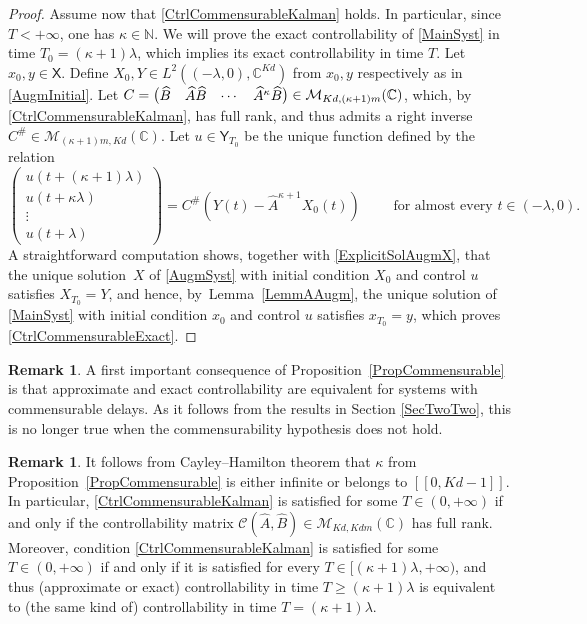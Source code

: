 \documentclass[JEP,XML,SOM,Unicode]{cedram}
\renewenvironment{bmatrix}{\bigl(\begin{matrix}}{\end{matrix}\bigr)}
\newcommand{\llbracket}{[\![}
\newcommand{\rrbracket}{]\!]}
\theoremstyle{plain}
\theoremstyle{definition}
\newtheorem{remk}[theo]{Remark}
\begin{document}
\begin{proof}
Assume now that \eqref{CtrlCommensurableKalman} holds. In particular, since $T < +\infty$, one has $\kappa \in \mathbb N$. We will prove the exact controllability of \eqref{MainSyst} in time $T_0 = (\kappa + 1)\lambda$, which implies its exact controllability in time $T$. Let $x_0, y \in \mathsf X$. Define $X_0, Y \in L^2((-\lambda, 0), \mathbb C^{Kd})$ from $x_0, y$ respectively as in \eqref{AugmInitial}. Let $C = \begin{bmatrix}\widehat B & \widehat A \widehat B & \cdots & \widehat A^\kappa \widehat B\end{bmatrix} \in \mathcal M_{Kd, (\kappa + 1) m}(\mathbb C)$, which, by \eqref{CtrlCommensurableKalman}, has full rank, and thus admits a right inverse $C^\# \in \mathcal M_{(\kappa + 1) m, Kd}(\mathbb C)$. Let $u \in \mathsf Y_{T_0}$ be the unique function defined by the relation
\[
\begin{pmatrix}
u(t + (\kappa + 1)\lambda) \\
u(t + \kappa \lambda) \\
\vdots \\
u(t + \lambda)
\end{pmatrix} = C^\# \left(Y(t) - \widehat A^{\kappa + 1} X_0(t)\right) \qquad \text{ for almost every } t \in (-\lambda, 0).
\]
A straightforward computation shows, together with \eqref{ExplicitSolAugmX}, that the unique solution~$X$ of \eqref{AugmSyst} with initial condition $X_0$ and control $u$ satisfies $X_{T_0} = Y$, and hence, by~Lemma~\ref{LemmAAugm}, the unique solution of \eqref{MainSyst} with initial condition $x_0$ and control $u$ satisfies $x_{T_0} = y$, which proves \eqref{CtrlCommensurableExact}.
\end{proof}

\begin{remk}
A first important consequence of Proposition~\ref{PropCommensurable} is that approximate and exact controllability are equivalent for systems with commensurable delays. As it follows from the results in Section \ref{SecTwoTwo}, this is no longer true when the commensurability hypothesis does not hold.
\end{remk}

\begin{remk}
\label{RemkCayleyHamilton}
It follows from Cayley--Hamilton theorem that $\kappa$ from Proposition~\ref{PropCommensurable} is either infinite or belongs to $\llbracket 0, Kd - 1\rrbracket$. In particular, \eqref{CtrlCommensurableKalman} is satisfied for some $T \in (0, +\infty)$ if and only if the controllability matrix $\mathcal C(\widehat A, \widehat B) \in \mathcal M_{Kd, Kdm}(\mathbb C)$ has full rank. Moreover, condition \eqref{CtrlCommensurableKalman} is satisfied for some $T \in (0, +\infty)$ if and only if it is satisfied for every $T \in [(\kappa + 1) \lambda, +\infty)$, and thus (approximate or exact) controllability in time $T \geq (\kappa + 1) \lambda$ is equivalent to (the same kind of) controllability in time $T = (\kappa + 1)\lambda$.
\end{remk}
\end{document}
